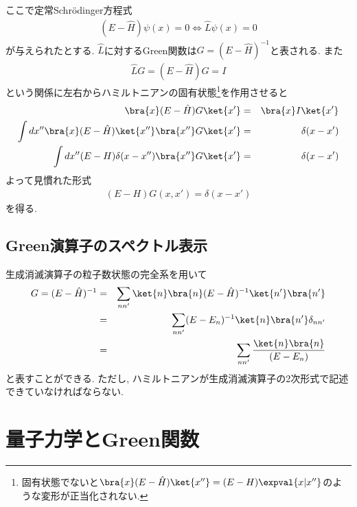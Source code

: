 \documentclass[10.5pt,a4paper]{jreport}
\begin{document}
ここで定常Schr\"odinger方程式
\begin{eqnarray}
  (E-\hat{H})\psi(x) = 0 \Longleftrightarrow \hat{L}\psi(x) = 0
\end{eqnarray}
が与えられたとする. $\hat{L}$に対するGreen関数は$G = (E-\hat{H})^{-1}$と表される. また
\begin{eqnarray}
  \hat{L}G = (E-\hat{H})G = I
\end{eqnarray}
という関係に左右からハミルトニアンの固有状態\footnote{固有状態でないと$\bra{x}(E-\hat{H})\ket{x''} = (E-H)\expval{x|x''}$のような変形が正当化されない.}を作用させると
\begin{eqnarray}
  \bra{x}(E-\hat{H})G\ket{x'} &=& \bra{x}I\ket{x'}\\
  \int dx''\bra{x}(E-\hat{H})\ket{x''}\bra{x''}G\ket{x'}&=& \delta(x-x')\\
  \int dx''(E-H)\delta(x - x'')\bra{x''}G\ket{x'}&=& \delta(x-x')
\end{eqnarray}
よって見慣れた形式
\begin{eqnarray}
  (E-H)G(x, x') = \delta(x-x')
\end{eqnarray}
を得る.
\subsection{Green演算子のスペクトル表示}
生成消滅演算子の粒子数状態の完全系を用いて
\begin{eqnarray}
  G = (E-\hat{H})^{-1} &=& \sum_{nn'}\ket{n}\bra{n}(E-\hat{H})^{-1}\ket{n'}\bra{n'}\\
  &=& \sum_{nn'}(E-E_n)^{-1}\ket{n}\bra{n'}\delta_{nn'}\\
  &=& \sum_{nn'}\frac{\ket{n}\bra{n}}{(E-E_n)}
\end{eqnarray}
と表すことができる. ただし, ハミルトニアンが生成消滅演算子の2次形式で記述できていなければならない.
\section{量子力学とGreen関数}
\end{document}
